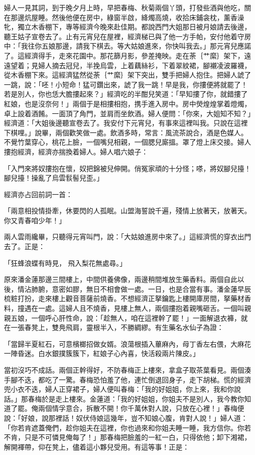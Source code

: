 婦人一見其詞，到于晚夕月上時，早把春梅、秋菊兩個丫頭，打發些酒與他吃，關在那邊炕屋睡。然後他便在房中，綠窗半啟，絳燭高燒，收拾床鋪衾枕，薰香澡牝，獨立木香棚下，專等經濟今晚來赴佳期。都說西門大姐那日被月娘請去後邊，聽王姑子宣卷去了。止有元宵兒在屋裡，經濟梯已與了他一方手帕，安付他着守房中：「我往你五娘那邊，請我下棋去。等大姑娘進來，你快叫我去。」那元宵兒應諾了。這經濟得手，走來花園中。那花篩月影，參差掩映。走在荼｛艹縻｝架下，遠遠望着；見婦人摘去冠兒，半挽烏雲，上着藕絲衫，下着翠紋裙，腳襯凌波羅襪，從木香棚下來。這經濟猛然從荼｛艹縻｝架下突出，雙手把婦人抱住。把婦人諕了一跳，說：「呸！小短命！猛可鑽出來，諕了我一跳！早是我，你摟便將就罷了！若是別人，你也恁大膽摟起來？」經濟吃的半酣兒笑道：「早知摟了你，就錯摟了紅娘，也是沒奈何！」兩個于是相摟相抱，携手進入房中。房中熒煌煌掌着燈燭，卓上設着酒餚。一面頂了角門，並肩而坐飲酒。婦人便問：「你來，大姐知不知？」經濟道：「大姐後邊聽宣卷去了。我安付下元宵兒，有事來這裡叫我。只說在這裡下棋哩。」說畢，兩個歡笑做一處。飲酒多時，常言：風流茶說合，酒是色媒人。不覺竹葉穿心，桃花上臉，一個嘴兒相親，一個腮兒廝搵。罩了燈上床交接。婦人摟抱經濟，經濟亦揣換着婦人。婦人唱六娘子：

「入門來將奴摟抱在懷，奴把錦被兒伸開。俏冤家頑的十分怪；嗏，將奴腳兒擡！腳兒擡！操亂了烏雲䯼髻兒歪。」

經濟亦占回前詞一首：

「兩意相投情掛牽，休要閃的人孤眠。山盟海誓說千遍，殘情上放著天，放著天。你又青春咱少年！」

兩人雲雨纔畢，只聽得元宵叫門，說：「大姑娘進房中來了。」這經濟慌的穿衣出門去了。正是：

「狂蜂浪蝶有時見，  飛入梨花無處尋。」

原來潘金蓮那邊三間樓上，中間供養佛像，兩邊稍間堆放生藥香料。兩個自此以後，情沾肺腑，意密如膠，無日不相會做一處。一日，也是合當有事。潘金蓮早辰梳粧打扮，走來樓上觀音菩薩前燒香。不想經濟正拏鑰匙上樓開庫房間，拏藥材香料，撞遇在一處。這婦人且不燒香，見樓上無人，兩個摟抱着親嘴砸舌。一個叫親親五娘，一個呼心肝性命，說：「趁無人，咱在這裡幹了罷！」一面解退衣褲，就在一張春凳上，雙鳧飛肩，靈根半入，不勝綢繆。有生藥名水仙子為證：

「當歸半夏紅石，可意檳榔招做女婿。浪蕩根插入蓽麻內，母丁香左右偎，大麻花一陣昏迷。白水銀撲簇簇下，紅娘子心內喜，快活殺兩片陳皮。」

當初沒巧不成話。兩個正幹得好，不防春梅正上樓來，拿盒子取茶葉看見。兩個湊手腳不迭，都吃了一驚。春梅恐怕羞了他，連忙倒退回身子，走下胡梯。慌的經濟兜小衣不迭，婦人正穿裙子，婦人便叫春梅：「我的好姐姐，你上來，我和你說話。」那春梅於是走上樓來。金蓮道：「我的好姐姐，你姐夫不是別人，我今教你知道了罷。俺兩個情孚意合，拆散不開！你千萬休對人說，只放在心裡！」春梅便說：「好娘，說那裡話！奴伏侍娘這幾年，豈不知娘心腹，肯對人說！」婦人道：「你若肯遮蓋俺們，趁你姐夫在這裡，你也過來和你姐夫睡一睡，我方信你。你若不肯，只是不可憐見俺每了！」那春梅把臉羞的一紅一白，只得依他；卸下湘裙，解開褌帶，仰在凳上，儘着這小夥兒受用。有這等事！正是：

